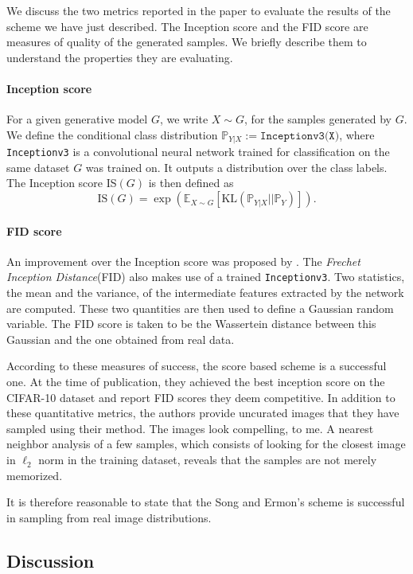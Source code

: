 \documentclass[10pt,journal,a4paper]{IEEEtran}
\theoremstyle{definition}
\newcommand{\Prb}{\mathbb{P}}
\newcommand{\E}{\mathbb{E}}
\newcommand{\KL}{\text{KL}}
\begin{document}
We discuss the two metrics reported in the paper to evaluate the results of the scheme we have just described. The Inception score and the FID score are measures of quality of the generated samples. We briefly describe them to understand the properties they are evaluating.

\paragraph{Inception score} For a given generative model $G$, we write $X \sim G$, for the samples generated by $G$. We define the conditional class distribution $\Prb_{Y|X} := \texttt{Inceptionv3(X)}$, where \texttt{Inceptionv3} is a convolutional neural network trained for classification on the same dataset $G$ was trained on. It outputs a distribution over the class labels. The Inception score IS$(G)$ is then defined as 
\[
\text{IS}(G) = \exp \left(\E_{X \sim G} [\KL(\Prb_{Y|X} || \Prb_Y)] \right).
\]

\paragraph{FID score}  An improvement over the Inception score was proposed by \cite{heusel_gans_2017}. The \textit{Frechet Inception Distance}(FID) also makes use of a trained \texttt{Inceptionv3}. Two statistics, the mean and the variance, of the intermediate features extracted by the network are computed. These two quantities are then used to define a Gaussian random variable. The FID score is taken to be the Wassertein distance between this Gaussian and the one obtained from real data.

According to these measures of success, the score based scheme is a successful one. At the time of publication, they achieved the best inception score on the CIFAR-10 dataset and report FID scores they deem competitive. In addition to these quantitative metrics, the authors provide uncurated images that they have sampled using their method. The images look compelling, to me. A nearest neighbor analysis of a few samples, which consists of looking for the closest image in $\ell_2$ norm in the training dataset, reveals that the samples are not merely memorized.

It is therefore reasonable to state that the Song and Ermon's scheme is successful in sampling from real image distributions.

\subsection{Discussion}
\end{document}
